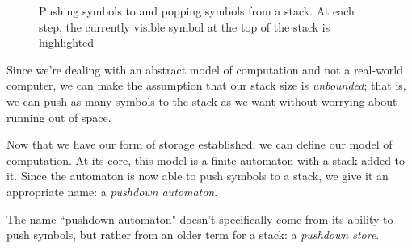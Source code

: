 \begin{figure}[b]
\begin{tikzpicture}[stack/.style={rectangle split, rectangle split parts=#1, rectangle split part fill={white,white,white,\fourthcolour}, draw, anchor=center}]
\end{tikzpicture}
\hspace{0cm}
\hspace{0cm}
\hspace{0cm}
\hspace{0cm}
\caption{Pushing symbols to and popping symbols from a stack. At each step, the currently visible symbol at the top of the stack is highlighted}
\label{fig:stacks}
\end{figure}

Since we're dealing with an abstract model of computation and not a real-world computer, we can make the assumption that our stack size is \emph{unbounded}; that is, we can push as many symbols to the stack as we want without worrying about running out of space.

Now that we have our form of storage established, we can define our model of computation. At its core, this model is a finite automaton with a stack added to it. Since the automaton is now able to push symbols to a stack, we give it an appropriate name: a \emph{pushdown automaton}.

\begin{remark}
The name ``pushdown automaton" doesn't specifically come from its ability to push symbols, but rather from an older term for a stack: a \emph{pushdown store}.
\end{remark}

